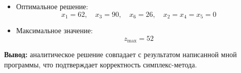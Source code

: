 \documentclass{report}
\begin{document}
\begin{enumerate}
\begin{itemize}
			\item Оптимальное решение:
			\[
			x_1 = 62,\quad x_3 = 90,\quad x_6 = 26,\quad x_2 = x_4 = x_5 = 0
			\]
		    \item Максимальное значение:
			\[
			z_{\max} = 52
			\]
		\end{itemize}
	\end{enumerate}
	
	\textbf{Вывод: }аналитическое решение совпадает с результатом написанной мной программы, что подтверждает корректность симплекс-метода.
\end{document}
